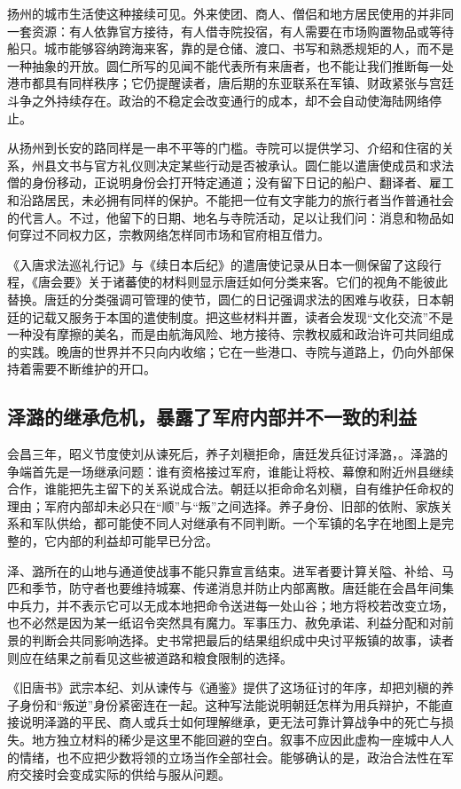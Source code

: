 扬州的城市生活使这种接续可见。外来使团、商人、僧侣和地方居民使用的并非同一套资源：有人依靠官方接待，有人借寺院投宿，有人需要在市场购置物品或等待船只。城市能够容纳跨海来客，靠的是仓储、渡口、书写和熟悉规矩的人，而不是一种抽象的开放。圆仁所写的见闻不能代表所有来唐者，也不能让我们推断每一处港市都具有同样秩序；它仍提醒读者，唐后期的东亚联系在军镇、财政紧张与宫廷斗争之外持续存在。政治的不稳定会改变通行的成本，却不会自动使海陆网络停止。

从扬州到长安的路同样是一串不平等的门槛。寺院可以提供学习、介绍和住宿的关系，州县文书与官方礼仪则决定某些行动是否被承认。圆仁能以遣唐使成员和求法僧的身份移动，正说明身份会打开特定通道；没有留下日记的船户、翻译者、雇工和沿路居民，未必拥有同样的保护。不能把一位有文字能力的旅行者当作普通社会的代言人。不过，他留下的日期、地名与寺院活动，足以让我们问：消息和物品如何穿过不同权力区，宗教网络怎样同市场和官府相互借力。

《入唐求法巡礼行记》与《续日本后纪》的遣唐使记录从日本一侧保留了这段行程，《唐会要》关于诸蕃使的材料则显示唐廷如何分类来客。它们的视角不能彼此替换。唐廷的分类强调可管理的使节，圆仁的日记强调求法的困难与收获，日本朝廷的记载又服务于本国的遣使制度。把这些材料并置，读者会发现“文化交流”不是一种没有摩擦的美名，而是由航海风险、地方接待、宗教权威和政治许可共同组成的实践。晚唐的世界并不只向内收缩；它在一些港口、寺院与道路上，仍向外部保持着需要不断维护的开口。

\subsection{泽潞的继承危机，暴露了军府内部并不一致的利益}
会昌三年，昭义节度使刘从谏死后，养子刘稹拒命，唐廷发兵征讨泽潞，。泽潞的争端首先是一场继承问题：谁有资格接过军府，谁能让将校、幕僚和附近州县继续合作，谁能把先主留下的关系说成合法。朝廷以拒命命名刘稹，自有维护任命权的理由；军府内部却未必只在“顺”与“叛”之间选择。养子身份、旧部的依附、家族关系和军队供给，都可能使不同人对继承有不同判断。一个军镇的名字在地图上是完整的，它内部的利益却可能早已分岔。

泽、潞所在的山地与通道使战事不能只靠宣言结束。进军者要计算关隘、补给、马匹和季节，防守者也要维持城寨、传递消息并防止内部离散。唐廷能在会昌年间集中兵力，并不表示它可以无成本地把命令送进每一处山谷；地方将校若改变立场，也不必然是因为某一纸诏令突然具有魔力。军事压力、赦免承诺、利益分配和对前景的判断会共同影响选择。史书常把最后的结果组织成中央讨平叛镇的故事，读者则应在结果之前看见这些被道路和粮食限制的选择。

《旧唐书》武宗本纪、刘从谏传与《通鉴》提供了这场征讨的年序，却把刘稹的养子身份和“叛逆”身份紧密连在一起。这种写法能说明朝廷怎样为用兵辩护，不能直接说明泽潞的平民、商人或兵士如何理解继承，更无法可靠计算战争中的死亡与损失。地方独立材料的稀少是这里不能回避的空白。叙事不应因此虚构一座城中人人的情绪，也不应把少数将领的立场当作全部社会。能够确认的是，政治合法性在军府交接时会变成实际的供给与服从问题。

